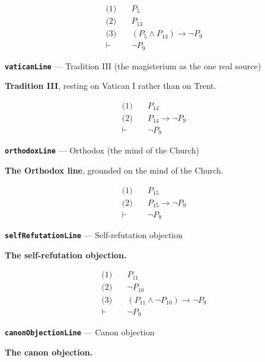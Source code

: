 \documentclass[11pt]{article}
\begin{document}
\begin{align*}
  \text{(1)} \quad & P_{5} \\
  \text{(2)} \quad & P_{13} \\
  \text{(3)} \quad & (P_{5} \land P_{13}) \rightarrow \lnot P_{9} \\
  \vdash \quad & \lnot P_{9}
\end{align*}
\par\medskip\noindent\textbf{\texttt{vatican\allowbreak{}Line}} --- Tradition III (the magisterium as the one real source)\par\nobreak\noindent
\textbf{Tradition III}, resting on Vatican I rather than on Trent.

\begin{align*}
  \text{(1)} \quad & P_{14} \\
  \text{(2)} \quad & P_{14} \rightarrow \lnot P_{9} \\
  \vdash \quad & \lnot P_{9}
\end{align*}
\par\medskip\noindent\textbf{\texttt{orthodox\allowbreak{}Line}} --- Orthodox (the mind of the Church)\par\nobreak\noindent
\textbf{The Orthodox line}, grounded on the mind of the Church.

\begin{align*}
  \text{(1)} \quad & P_{15} \\
  \text{(2)} \quad & P_{15} \rightarrow \lnot P_{9} \\
  \vdash \quad & \lnot P_{9}
\end{align*}
\par\medskip\noindent\textbf{\texttt{self\allowbreak{}Refutation\allowbreak{}Line}} --- Self-refutation objection\par\nobreak\noindent
\textbf{The self-refutation objection.}

\begin{align*}
  \text{(1)} \quad & P_{11} \\
  \text{(2)} \quad & \lnot P_{10} \\
  \text{(3)} \quad & (P_{11} \land \lnot P_{10}) \rightarrow \lnot P_{9} \\
  \vdash \quad & \lnot P_{9}
\end{align*}
\par\medskip\noindent\textbf{\texttt{canon\allowbreak{}Objection\allowbreak{}Line}} --- Canon objection\par\nobreak\noindent
\textbf{The canon objection.}
\end{document}

